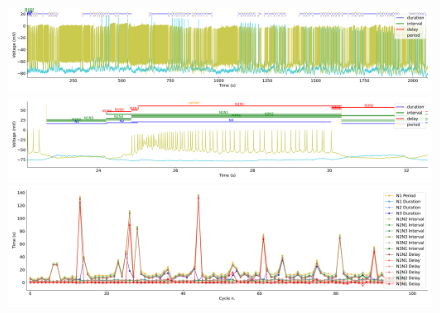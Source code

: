 %






\begin{figure}[htbp]
	\centering
	\begin{minipage}[b]{\textwidth}
		\centering
		\includegraphics[width=\textwidth,height=0.1\textheight]{./invariants/data/SUSSEX/prep2/images/spontaneous_signal_intervals_zoom.pdf}
		\includegraphics[width=\textwidth]{./invariants/data/SUSSEX/prep2/images/spontaneous_signal_intervals_cycle.pdf}
		\includegraphics[width=\textwidth]{./invariants/data/SUSSEX/prep2/images/spontaneous_time_cycle.pdf}
	\end{minipage}
	\centering
	\begin{minipage}[b]{0.45\textwidth}
		\centering

\end{minipage}
\end{figure}
